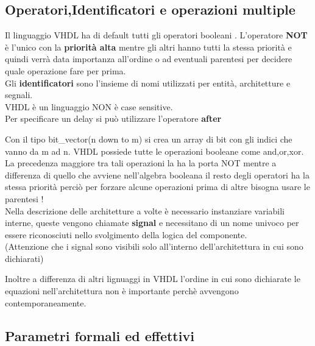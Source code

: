 \documentclass[a4paper]{book}
\begin{document}
\subsection{Operatori,Identificatori e operazioni multiple}

Il linguaggio VHDL ha di default tutti gli operatori booleani .
L'operatore \textbf{NOT} è l'unico con la \textbf{priorità alta} mentre gli altri hanno tutti la stessa priorità e quindi verrà data importanza all'ordine o ad eventuali parentesi per decidere quale operazione fare per prima.\\

Gli \textbf{identificatori} sono l'insieme di nomi utilizzati per entità, architetture e segnali.\\

VHDL è un linguaggio NON è case sensitive.\\

Per specificare un delay si può utilizzare l'operatore \textbf{after}

Con il tipo bit\_vector(n down to m) si crea un array di bit con gli indici che vanno da m ad n.
VHDL possiede tutte le operazioni booleane come and,or,xor.\\

La precedenza maggiore tra tali operazioni la ha la porta NOT mentre a differenza di quello che avviene nell'algebra booleana il resto degli operatori ha la stessa priorità perciò per forzare alcune operazioni prima di altre bisogna usare le parentesi !\\

Nella descrizione delle architetture a volte è necessario instanziare variabili interne, queste vengono chiamate \textbf{signal} e necessitano di un nome univoco per essere riconosciuti nello svolgimento della logica del componente.\\
(Attenzione che i signal sono visibili solo all'interno dell'architettura in cui sono dichiarati)

Inoltre a differenza di altri lignuaggi in VHDL l'ordine in cui sono dichiarate le equazioni nell'architettura non è importante perchè avvengono contemporaneamente.

\subsection{Parametri formali ed effettivi}
\end{document}
